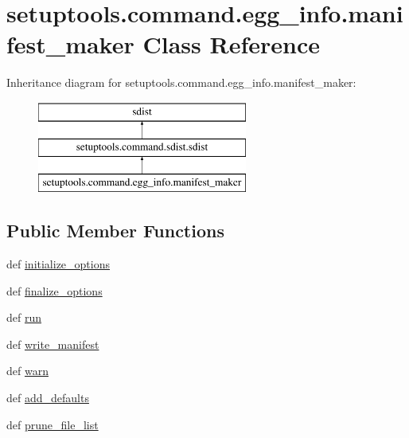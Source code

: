 \hypertarget{classsetuptools_1_1command_1_1egg__info_1_1manifest__maker}{}\section{setuptools.\+command.\+egg\+\_\+info.\+manifest\+\_\+maker Class Reference}
\label{classsetuptools_1_1command_1_1egg__info_1_1manifest__maker}
Inheritance diagram for setuptools.\+command.\+egg\+\_\+info.\+manifest\+\_\+maker\+:\begin{figure}[H]
\begin{center}
\leavevmode
\includegraphics[height=3.000000cm]{classsetuptools_1_1command_1_1egg__info_1_1manifest__maker}
\end{center}
\end{figure}
\subsection*{Public Member Functions}
\begin{DoxyCompactItemize}
\item 
def \hyperlink{classsetuptools_1_1command_1_1egg__info_1_1manifest__maker_a3dbd905df3f05d711cda20d9160f6356}{initialize\+\_\+options}
\item 
def \hyperlink{classsetuptools_1_1command_1_1egg__info_1_1manifest__maker_a7e26a349ff2b79afb98345df65cb0a0e}{finalize\+\_\+options}
\item 
def \hyperlink{classsetuptools_1_1command_1_1egg__info_1_1manifest__maker_aff76623098328fe993d9d9088d9a9714}{run}
\item 
def \hyperlink{classsetuptools_1_1command_1_1egg__info_1_1manifest__maker_a2a66211b109fc0ea69ffcf81c5e1f123}{write\+\_\+manifest}
\item 
def \hyperlink{classsetuptools_1_1command_1_1egg__info_1_1manifest__maker_a640ce8410b1b01a4d6bfe6a95db69cc1}{warn}
\item 
def \hyperlink{classsetuptools_1_1command_1_1egg__info_1_1manifest__maker_a56ca9cec00645cece8ccdf67cc46c2ed}{add\+\_\+defaults}
\item 
def \hyperlink{classsetuptools_1_1command_1_1egg__info_1_1manifest__maker_a4b54ee940f993be03fdf017e93caa27b}{prune\+\_\+file\+\_\+list}
\end{DoxyCompactItemize}
